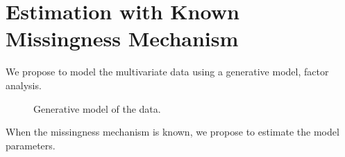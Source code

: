 \documentclass{article}
\begin{document}
\section{Estimation with Known Missingness Mechanism}
We propose to model the multivariate data using a generative model, factor analysis. 

\begin{figure}
\centering
\caption{Generative model of the data.}
\end{figure}
    
    



When the missingness mechanism is known, we propose to estimate the model parameters.
\end{document}

